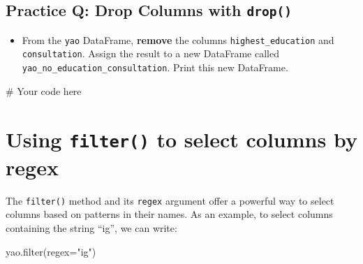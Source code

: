\documentclass[
  letterpaper,
  DIV=11,
  numbers=noendperiod]{scrreprt}
\newenvironment{Shaded}{\begin{snugshade}}{\end{snugshade}}
\newcommand{\BuiltInTok}[1]{\textcolor[rgb]{0.00,0.23,0.31}{#1}}
\newcommand{\CommentTok}[1]{\textcolor[rgb]{0.37,0.37,0.37}{#1}}
\newcommand{\NormalTok}[1]{\textcolor[rgb]{0.00,0.23,0.31}{#1}}
\newcommand{\OperatorTok}[1]{\textcolor[rgb]{0.37,0.37,0.37}{#1}}
\newcommand{\StringTok}[1]{\textcolor[rgb]{0.13,0.47,0.30}{#1}}
\providecommand{\tightlist}{%
  \setlength{\itemsep}{0pt}\setlength{\parskip}{0pt}}\usepackage{longtable,booktabs,array}
\begin{document}
\begin{tcolorbox}[enhanced jigsaw, colframe=quarto-callout-tip-color-frame, opacityback=0, titlerule=0mm, bottomrule=.15mm, breakable, leftrule=.75mm, colbacktitle=quarto-callout-tip-color!10!white, title=\textcolor{quarto-callout-tip-color}{\faLightbulb}\hspace{0.5em}{Practice}, rightrule=.15mm, coltitle=black, opacitybacktitle=0.6, colback=white, left=2mm, arc=.35mm, toptitle=1mm, bottomtitle=1mm, toprule=.15mm]

\subsection{\texorpdfstring{Practice Q: Drop Columns with
\texttt{drop()}}{Practice Q: Drop Columns with drop()}}\label{practice-q-drop-columns-with-drop}

\begin{itemize}
\tightlist
\item
  From the \texttt{yao} DataFrame, \textbf{remove} the columns
  \texttt{highest\_education} and \texttt{consultation}. Assign the
  result to a new DataFrame called
  \texttt{yao\_no\_education\_consultation}. Print this new DataFrame.
\end{itemize}

\begin{Shaded}
\begin{Highlighting}[]
\CommentTok{\# Your code here}
\end{Highlighting}
\end{Shaded}

\end{tcolorbox}

\section{\texorpdfstring{Using \texttt{filter()} to select columns by
regex}{Using filter() to select columns by regex}}\label{using-filter-to-select-columns-by-regex}

The \texttt{filter()} method and its \texttt{regex} argument offer a
powerful way to select columns based on patterns in their names. As an
example, to select columns containing the string ``ig'', we can write:

\begin{Shaded}
\begin{Highlighting}[]
\NormalTok{yao.}\BuiltInTok{filter}\NormalTok{(regex}\OperatorTok{=}\StringTok{"ig"}\NormalTok{)}
\end{Highlighting}
\end{Shaded}
\end{document}
